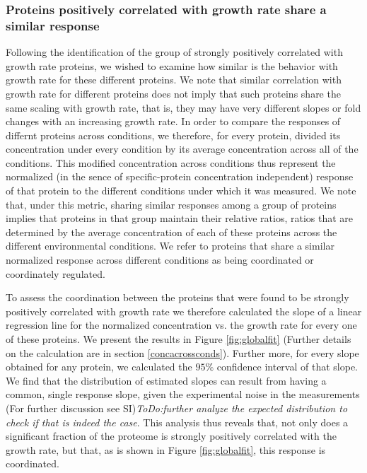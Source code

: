 \documentclass[notitlepage]{article}
\begin{document}
\subsubsection{Proteins positively correlated with growth rate share a similar response}
\label{propchange}
Following the identification of the group of strongly positively correlated with growth rate proteins, we wished to examine how similar is the behavior with growth rate for these different proteins.
We note that similar correlation with growth rate for different proteins does not imply that such proteins share the same scaling with growth rate, that is,  they may have very different slopes or fold changes with an increasing growth rate.
In order to compare the responses of differnt proteins across conditions, we therefore, for every protein, divided its concentration under every condition by its average concentration across all of the conditions.
This modified concentration across conditions thus represent the normalized (in the sence of specific-protein concentration independent) response of that protein to the different conditions under which it was measured.
We note that, under this metric, sharing similar responses among a group of proteins implies that proteins in that group maintain their relative ratios, ratios that are determined by the average concentration of each of these proteins across the different environmental conditions.
We refer to proteins that share a similar normalized response across different conditions as being coordinated or coordinately regulated.

To assess the coordination between the proteins that were found to be strongly positively correlated with growth rate we therefore calculated the slope of a linear regression line for the normalized concentration vs. the growth rate for every one of these proteins.
We present the results in Figure \ref{fig:globalfit} (Further details on the calculation are in section \ref{concacrossconds}).
Further more, for every slope obtained for any protein, we calculated the $95\%$ confidence interval of that slope.
We find that the distribution of estimated slopes can result from having a common, single response slope, given the experimental noise in the measurements (For further discussion see SI)\emph{ToDo:further analyze the expected distribution to check if that is indeed the case}.
This analysis thus reveals that, not only does a significant fraction of the proteome is strongly positively correlated with the growth rate, but that, as is shown in Figure \ref{fig:globalfit}, this response is coordinated.
\end{document}
